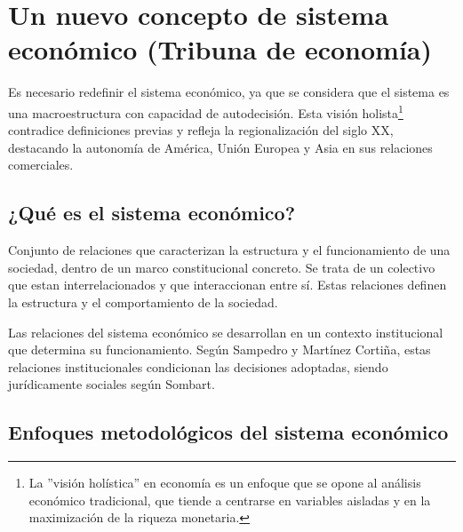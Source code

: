 \documentclass[12pt]{book} %
\begin{document}
\hypertarget{un-nuevo-concepto-de-sistema-econuxf3mico-tribuna-de-economuxeda}{%
\section{Un nuevo concepto de sistema económico (Tribuna de
economía)}\label{un-nuevo-concepto-de-sistema-econuxf3mico-tribuna-de-economuxeda}}

Es necesario redefinir el sistema económico, ya que se considera que el
sistema es una macroestructura con capacidad de autodecisión. Esta
visión
holista\footnote{La ''visión holística'' en economía es un enfoque que se opone al análisis económico tradicional, que tiende a centrarse en variables aisladas y en la maximización de la riqueza monetaria.}
contradice definiciones previas y refleja la regionalización del siglo
XX, destacando la autonomía de América, Unión Europea y Asia en sus
relaciones comerciales.

\hypertarget{quuxe9-es-el-sistema-econuxf3mico}{%
\subsection{¿Qué es el sistema
económico?}\label{quuxe9-es-el-sistema-econuxf3mico}}

Conjunto de relaciones que caracterizan la estructura y el
funcionamiento de una sociedad, dentro de un marco constitucional
concreto. Se trata de un colectivo que estan interrelacionados y que
interaccionan entre sí. Estas relaciones definen la estructura y el
comportamiento de la sociedad.

Las relaciones del sistema económico se desarrollan en un contexto
institucional que determina su funcionamiento. Según Sampedro y Martínez
Cortiña, estas relaciones institucionales condicionan las decisiones
adoptadas, siendo jurídicamente sociales según Sombart.

\hypertarget{enfoques-metodoluxf3gicos-del-sistema-econuxf3mico}{%
\subsection{Enfoques metodológicos del sistema
económico}\label{enfoques-metodoluxf3gicos-del-sistema-econuxf3mico}}
\end{document}
